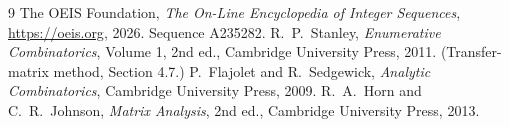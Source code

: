 \documentclass[11pt,a4paper]{article}
\theoremstyle{plain}
\theoremstyle{definition}
\begin{document}
\begin{thebibliography}{9}
 The OEIS Foundation, \emph{The On-Line Encyclopedia of Integer
Sequences}, \url{https://oeis.org}, 2026. Sequence A235282.
 R.~P.~Stanley, \emph{Enumerative Combinatorics}, Volume 1, 2nd ed.,
Cambridge University Press, 2011. (Transfer-matrix method, Section 4.7.)
 P.~Flajolet and R.~Sedgewick, \emph{Analytic Combinatorics}, Cambridge
University Press, 2009.
 R.~A.~Horn and C.~R.~Johnson, \emph{Matrix Analysis}, 2nd ed., Cambridge
University Press, 2013.
\end{thebibliography}
\end{document}
